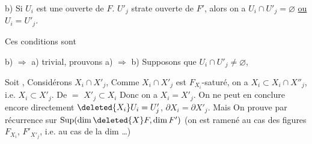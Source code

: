 



b) Si $U_i$ est une  ouverte de $F$. $U'_j$ strate ouverte de $F'$, alors on a $U_i\cap U'_j=\varnothing$ \uline{ou} $U_i=U'_j$.

Ces conditions sont 



b) $\Rightarrow$ a) trivial, prouvons a) $\Rightarrow$ b)  Supposons que $U_i\cap U'_j\ne\varnothing$,  


 Soit  , Considérons $X_i\cap X'_j$,  Comme $X_i\cap X'_j$ est  $F_{X_i}$-saturé,    on a $X_i\subset X_i\cap X''_j$,
 i.e. $X_i\subset X'_j$. De $=$ $X'_j\subset X_i$ Donc on a $X_i=X'_j$. On ne peut en conclure encore directement $\deleted{X_i}U_i=U'_j$,   $\partial X_i=\partial X'_j$. Mais
On  prouve  par récurrence sur  $\operatorname{Sup}(\dim\deleted{X}F,\dim F')$ (on est ramené au cas des figures $F_{X_i}$, $F'_{X'_j}$, i.e. au cas de la dim \ldots)
